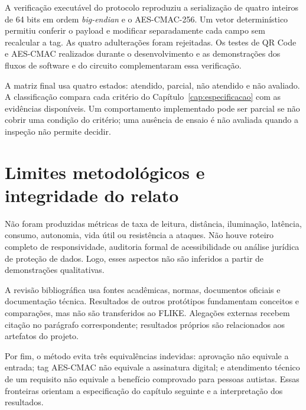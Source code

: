 A verificação executável do protocolo reproduziu a serialização de quatro inteiros de 64 bits em ordem \textit{big-endian} e o AES-CMAC-256. Um vetor determinístico permitiu conferir o payload e modificar separadamente cada campo sem recalcular a tag. As quatro adulterações foram rejeitadas. Os testes de QR Code e AES-CMAC realizados durante o desenvolvimento e as demonstrações dos fluxos de software e do circuito complementaram essa verificação.

A matriz final usa quatro estados: atendido, parcial, não atendido e não avaliado. A classificação compara cada critério do Capítulo~\ref{cap:especificacao} com as evidências disponíveis. Um comportamento implementado pode ser parcial se não cobrir uma condição do critério; uma ausência de ensaio é não avaliada quando a inspeção não permite decidir.

\section{Limites metodológicos e integridade do relato}

Não foram produzidas métricas de taxa de leitura, distância, iluminação, latência, consumo, autonomia, vida útil ou resistência a ataques. Não houve roteiro completo de responsividade, auditoria formal de acessibilidade ou análise jurídica de proteção de dados. Logo, esses aspectos não são inferidos a partir de demonstrações qualitativas.

A revisão bibliográfica usa fontes acadêmicas, normas, documentos oficiais e documentação técnica. Resultados de outros protótipos fundamentam conceitos e comparações, mas não são transferidos ao FLIKE. Alegações externas recebem citação no parágrafo correspondente; resultados próprios são relacionados aos artefatos do projeto.

Por fim, o método evita três equivalências indevidas: aprovação não equivale a entrada; tag AES-CMAC não equivale a assinatura digital; e atendimento técnico de um requisito não equivale a benefício comprovado para pessoas autistas. Essas fronteiras orientam a especificação do capítulo seguinte e a interpretação dos resultados.
